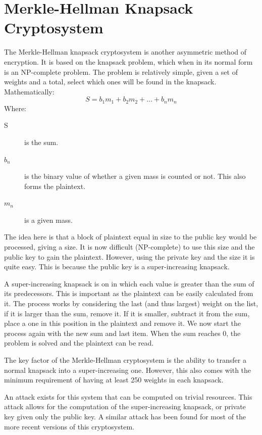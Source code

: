 	\section{Merkle-Hellman Knapsack Cryptosystem}
		The Merkle-Hellman knapsack cryptosystem is another asymmetric method of encryption. 
		It is based on the knapsack problem, which when in its normal form is an NP-complete problem. 
		The problem is relatively simple, given a set of weights and a total, select which ones will be found in the knapsack. 
		Mathematically:
		\[S = b_1m_1 + b_2m_2 +\ldots+ b_nm_n\]
		Where:
		\begin{description}
			\item[S] is the sum.
			\item[$b_n$] is the binary value of whether a given mass is counted or not. 
				This also forms the plaintext. 
			\item[$m_n$] is a given mass. 
		\end{description}

		The idea here is that a block of plaintext equal in size to the public key would be processed, giving a size. 
		It is now difficult (NP-complete) to use this size and the public key to gain the plaintext. 
		However, using the private key and the size it is quite easy. 
		This is because the public key is a super-increasing knapsack. 

		A super-increasing knapsack is on in which each value is greater than the sum of its predecessors. 
		This is important as the plaintext can be easily calculated from it. 
		The process works by considering the last (and thus largest) weight on the list, if it is larger than the sum, remove it.
		If it is smaller, subtract it from the sum, place a one in this position in the plaintext and remove it.
		We now start the process again with the new sum and last item. 
		When the sum reaches 0, the problem is solved and the plaintext can be read. 

		The key factor of the Merkle-Hellman cryptosystem is the ability to transfer a normal knapsack into a super-increasing one.
		However, this also comes with the minimum requirement of having at least 250 weights in each knapsack. 

		An attack exists for this system that can be computed on trivial resources\cite{BrokenKnapsack}. 
		This attack allows for the computation of the super-increasing knapsack, or private key given only the public key. 
		A similar attack has been found for most of the more recent versions of this cryptosystem. 
